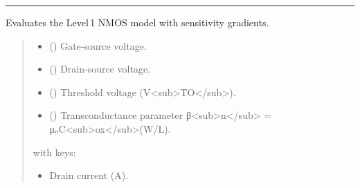 \documentclass[letterpaper,10pt,english]{sphinxmanual}
\begin{document}
\bigskip\hrule\bigskip


\begin{fulllineitems}
\label{\detokenize{diode_mosfet_models:evaluate_nmos}}
\pysigstartsignatures
\pysiglinewithargsret
{}
{\sphinxparamcomma {}\sphinxparamcomma {}\sphinxparamcomma {}}
{}
\pysigstopsignatures
\sphinxAtStartPar
Evaluates the Level 1 NMOS model with sensitivity gradients.
\begin{quote}\begin{description}
\begin{itemize}
\item {} 
\sphinxAtStartPar
{} () \textendash{} Gate‑source voltage.

\item {} 
\sphinxAtStartPar
{} () \textendash{} Drain‑source voltage.

\item {} 
\sphinxAtStartPar
{} () \textendash{} Threshold voltage (V\textless{}sub\textgreater{}TO\textless{}/sub\textgreater{}).

\item {} 
\sphinxAtStartPar
{} () \textendash{} Transconductance parameter β\textless{}sub\textgreater{}n\textless{}/sub\textgreater{} = μₙC\textless{}sub\textgreater{}ox\textless{}/sub\textgreater{}(W/L).

\end{itemize}

\sphinxAtStartPar

\sphinxAtStartPar
{} with keys:
\begin{itemize}
\item {} 
\sphinxAtStartPar
{}   \textendash{} Drain current (A).


\end{itemize}
\end{description}
\end{quote}
\end{fulllineitems}
\end{document}
